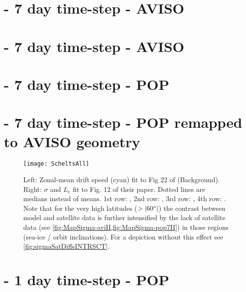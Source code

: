 
\section{\MI\;- 7 day time-step - AVISO}
\label{section:aviI}

\FloatBarrier

\section{\MII\;- 7 day time-step - AVISO}
\label{section:aviII}

\FloatBarrier

\section{\MII\;- 7 day time-step - POP}
\label{section:pop7II}

\FloatBarrier

\section{\MII\;- 7 day time-step - POP remapped to AVISO geometry}
\label{section:p2aII}

\FloatBarrier


\begin{figure}
\texttt{[image: ScheltsAll]}
\caption{
Left: Zonal-mean drift speed (cyan) fit to Fig 22 of  (Background).
Right: $\sigma$ and $L_{e}$ fit to Fig. 12 of their paper. Dotted lines are medians instead of means.
1st row: \protect{\aviII},
2nd row: \protect{\aviI},
3rd row: \protect{\pToaII},
4th row: \protect{\popSevenII}.
Note that for the very high latitudes ($>\left|60^\circ\right|$) the contrast between model and satellite data is further intensified by the lack of satellite data (see \cref{fig:MapSigma-aviII,fig:MapSigma-pop7II}) in those regions (sea-ice / orbit inclinations).
For a depiction without this effect see \cref{fig:sigmaSatDiffsINTRSCT}.
}
\label{fig:ScheltsAll}
\end{figure}


\section{\MII\;- 1 day time-step - POP}
\label{section:pop1ISO}
